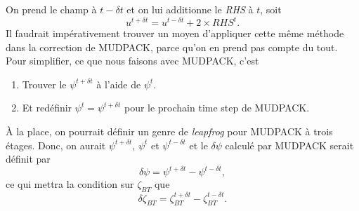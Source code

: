 \documentclass[10pt]{article}
\numberwithin{equation}{section}
\begin{document}
On prend le champ à \(t-\delta t\) et on lui additionne le \emph{RHS} à \(t\), soit
\begin{equation}
   u^{t+\delta t} = u^{t-\delta t} + 2\times RHS^t.
\end{equation}
Il faudrait impérativement trouver un moyen d'appliquer cette même méthode dans la correction de MUDPACK, parce qu'on en prend pas compte du tout.
Pour simplifier, ce que nous faisons avec MUDPACK, c'est
\begin{enumerate}
\item Trouver le \(\psi^{t+\delta t}\) à l'aide de \(\psi^t\).
\item Et redéfinir \(\psi^t = \psi^{t+\delta t}\) pour le prochain time step de MUDPACK.
\end{enumerate}

À la place, on pourrait définir un genre de \emph{leapfrog} pour MUDPACK à trois étages.
Donc, on aurait \(\psi^{t+\delta t}\), \(\psi^t\) et \(\psi^{t-\delta t}\) et le \(\delta \psi\) calculé par MUDPACK serait définit par
\begin{equation}
   \delta \psi = \psi^{t+\delta t} - \psi^{t-\delta t},
\end{equation}
ce qui mettra la condition sur \(\zeta_{BT}\) que
\begin{equation}
   \delta \zeta_{BT} = \zeta_{BT}^{t+\delta t} - \zeta_{BT}^{t-\delta t}.
\end{equation}
\end{document}
